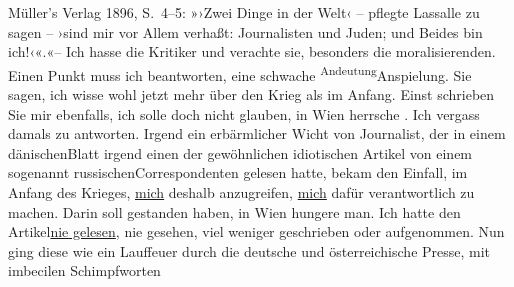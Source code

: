 \begin{ledgroupsized}[t]{13cm}
{{{{                        Müller’s Verlag}{ }1896, S. 4–5: »›Zwei Dinge in der Welt‹ – pflegte
                        Lassalle zu sagen – ›sind mir vor Allem
                     verhaßt: Journalisten und Juden; und Beides bin ich!‹«.}}}\label{K_L02223_1h}«– Ich
               hasse die Kritiker und verachte sie, besonders die moralisierenden.\pend
           \pstart
           Einen Punkt muss ich beantworten, eine schwache \substVorne{}\textsuperscript{Andeutung}{\allowbreak}\substDazwischen{}Anspielung\substHinten{}. Sie sagen, ich wisse wohl jetzt mehr über den Krieg als im Anfang. Einst
               schrieben Sie mir ebenfalls, ich solle doch nicht glauben, in Wien herrsche \label{K_L02223_2v}\label{K_L02223_2h}. {\pb}Ich vergass damals zu
               antworten.\pend
           \pstart
           Irgend ein erbärmlicher Wicht von Journalist, der in einem dänischenBlatt irgend einen der gewöhnlichen idiotischen Artikel von einem sogenannt russischenCorrespondenten gelesen hatte,
               bekam den Einfall, im Anfang des Krieges, \uline{mich}
               deshalb anzugreifen, \uline{mich} dafür verantwortlich zu
               machen. Darin soll gestanden haben, in Wien hungere
               man.\pend
           \pstart
           Ich hatte den Artikel\uline{nie gelesen}, nie gesehen, viel weniger geschrieben
               oder aufgenommen. Nun ging diese \label{K_L02223_3v}\label{K_L02223_3h}
               wie ein Lauffeuer durch die deutsche und österreichische Presse, mit imbecilen Schimpfworten

\end{ledgroupsized}
